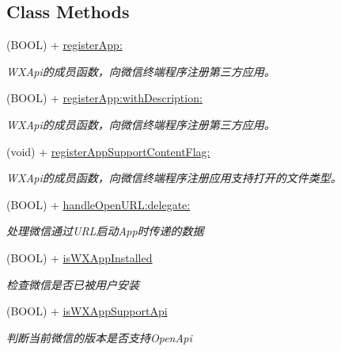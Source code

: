 \subsection*{Class Methods}
\begin{DoxyCompactItemize}
\item 
(B\+O\+OL) + \mbox{\hyperlink{interface_w_x_api_a84341d7a4aea16c2fd6e74708a569564}{register\+App\+:}}
\begin{DoxyCompactList}\small\item\em W\+X\+Api的成员函数，向微信终端程序注册第三方应用。 \end{DoxyCompactList}\item 
(B\+O\+OL) + \mbox{\hyperlink{interface_w_x_api_a76af46b7bb7e49aef40476a0dc377472}{register\+App\+:with\+Description\+:}}
\begin{DoxyCompactList}\small\item\em W\+X\+Api的成员函数，向微信终端程序注册第三方应用。 \end{DoxyCompactList}\item 
(void) + \mbox{\hyperlink{interface_w_x_api_a3a8dd85dbe67ae84d4c75d674d781c9b}{register\+App\+Support\+Content\+Flag\+:}}
\begin{DoxyCompactList}\small\item\em W\+X\+Api的成员函数，向微信终端程序注册应用支持打开的文件类型。 \end{DoxyCompactList}\item 
(B\+O\+OL) + \mbox{\hyperlink{interface_w_x_api_aab36d7c09414d7bc3d7ca200b48f2f9c}{handle\+Open\+U\+R\+L\+:delegate\+:}}
\begin{DoxyCompactList}\small\item\em 处理微信通过\+U\+R\+L启动\+App时传递的数据 \end{DoxyCompactList}\item 
(B\+O\+OL) + \mbox{\hyperlink{interface_w_x_api_a3684676bea249fdd0708a38ee74f0604}{is\+W\+X\+App\+Installed}}
\begin{DoxyCompactList}\small\item\em 检查微信是否已被用户安装 \end{DoxyCompactList}\item 
(B\+O\+OL) + \mbox{\hyperlink{interface_w_x_api_a1ae34dd86ae2c2f553dd6981a35397ee}{is\+W\+X\+App\+Support\+Api}}
\begin{DoxyCompactList}\small\item\em 判断当前微信的版本是否支持\+Open\+Api \end{DoxyCompactList}\item 

\end{DoxyCompactItemize}
